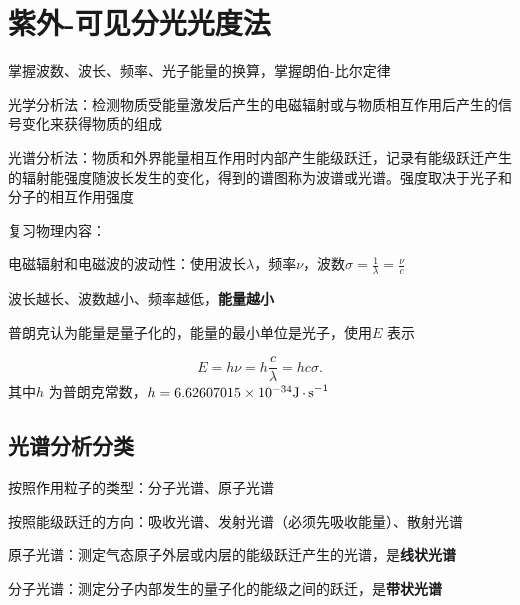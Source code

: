 \section{紫外-可见分光光度法}%
\label{sec:紫外-可见分光光度法}
掌握波数、波长、频率、光子能量的换算，掌握朗伯-比尔定律
\begin{defi}
    光学分析法：检测物质受能量激发后产生的电磁辐射或与物质相互作用后产生的信号变化来获得物质的组成

    光谱分析法：物质和外界能量相互作用时内部产生能级跃迁，记录有能级跃迁产生的辐射能强度随波长发生的变化，得到的谱图称为波谱或光谱。强度取决于光子和分子的相互作用强度
\end{defi}
复习物理内容：
\begin{notation}
    电磁辐射和电磁波的波动性：使用波长$\lambda$，频率$\nu$，波数$\sigma = \frac{1}{\lambda}=\frac{\nu}{c}$
\end{notation}
波长越长、波数越小、频率越低，\textbf{能量越小}
\begin{notation}
    普朗克认为能量是量子化的，能量的最小单位是光子，使用$E$ 表示
\end{notation}
\[
    E = h\nu =h \frac{c}{\lambda}=hc\sigma
.\]
其中$h$ 为普朗克常数，$h =6.62607015 \times 10^{-34}\ce{J*s^{-1}}$
\subsection{光谱分析分类}%
\label{sub:光谱分析分类}
按照作用粒子的类型：分子光谱、原子光谱

按照能级跃迁的方向：吸收光谱、发射光谱（必须先吸收能量）、散射光谱
\begin{notation}
    原子光谱：测定气态原子外层或内层的能级跃迁产生的光谱，是\textbf{线状光谱}

    分子光谱：测定分子内部发生的量子化的能级之间的跃迁，是\textbf{带状光谱}
\end{notation}
